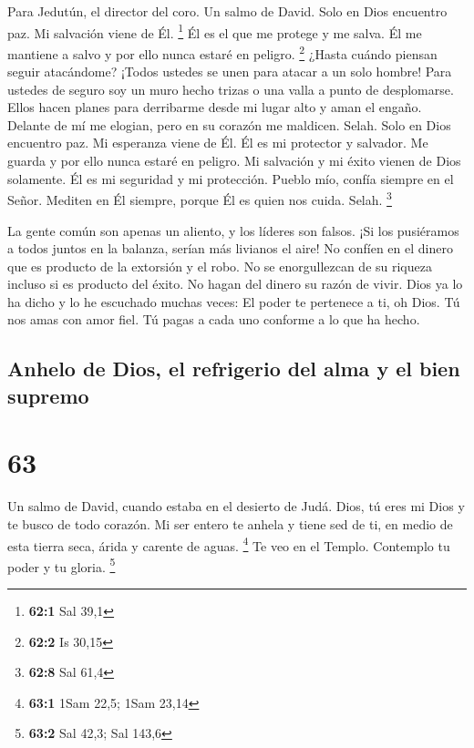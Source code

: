 Para Jedutún, el director del coro. Un salmo de David.  Solo
en Dios encuentro paz. Mi salvación viene de Él. \footnote{\textbf{62:1}
  Sal 39,1}  Él es el que me protege y me salva. Él me
mantiene a salvo y por ello nunca estaré en peligro. \footnote{\textbf{62:2}
  Is 30,15}  ¿Hasta cuándo piensan seguir atacándome? ¡Todos
ustedes se unen para atacar a un solo hombre! Para ustedes de seguro soy
un muro hecho trizas o una valla a punto de desplomarse. 
Ellos hacen planes para derribarme desde mi lugar alto y aman el engaño.
Delante de mí me elogian, pero en su corazón me maldicen. Selah.
 Solo en Dios encuentro paz. Mi esperanza viene de Él.
 Él es mi protector y salvador. Me guarda y por ello nunca
estaré en peligro.  Mi salvación y mi éxito vienen de Dios
solamente. Él es mi seguridad y mi protección.  Pueblo mío,
confía siempre en el Señor. Mediten en Él siempre, porque Él es quien
nos cuida. Selah. \footnote{\textbf{62:8} Sal 61,4}

 La gente común son apenas un aliento, y los líderes son
falsos. ¡Si los pusiéramos a todos juntos en la balanza, serían más
livianos el aire!  No confíen en el dinero que es producto
de la extorsión y el robo. No se enorgullezcan de su riqueza incluso si
es producto del éxito. No hagan del dinero su razón de vivir.
 Dios ya lo ha dicho y lo he escuchado muchas veces: El
poder te pertenece a ti, oh Dios.  Tú nos amas con amor
fiel. Tú pagas a cada uno conforme a lo que ha hecho.

\hypertarget{anhelo-de-dios-el-refrigerio-del-alma-y-el-bien-supremo}{%
\subsection{Anhelo de Dios, el refrigerio del alma y el bien
supremo}\label{anhelo-de-dios-el-refrigerio-del-alma-y-el-bien-supremo}}

\hypertarget{section-62}{%
\section{63}\label{section-62}}

Un salmo de David, cuando estaba en el desierto de Judá. 
Dios, tú eres mi Dios y te busco de todo corazón. Mi ser entero te
anhela y tiene sed de ti, en medio de esta tierra seca, árida y carente
de aguas. \footnote{\textbf{63:1} 1Sam 22,5; 1Sam 23,14}  Te
veo en el Templo. Contemplo tu poder y tu gloria. \footnote{\textbf{63:2}
  Sal 42,3; Sal 143,6}

